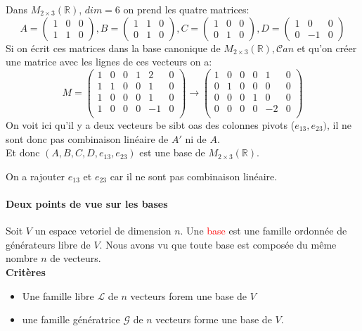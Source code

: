 \begin{exemple}
Dans $M_{2 \times 3}(\mathbb{R})$, $dim = 6$ on prend les quatre matrices:
\[A = \begin{pmatrix}
    1 & 0 & 0 \\ 1 & 1 & 0
\end{pmatrix} ,  B = \begin{pmatrix}
    1 & 1 & 0 \\ 0 & 1 & 0
\end{pmatrix}, C  = \begin{pmatrix}
    1 & 0 & 0 \\ 0 & 1 & 0
\end{pmatrix}, D = \begin{pmatrix}
    1 & 0 & 0 \\ 0 & -1 & 0
\end{pmatrix}\]
Si on écrit ces matrices dans la base canonique de $M_{2\times 3}(\mathbb{R}), \mathcal{C}an$ et qu'on créer une matrice avec les lignes de ces vecteurs on a:
\[M = \begin{pmatrix}
    1 & 0 & 0 & 1 & 2 & 0\\
    1 & 1 & 0 & 0 & 1 & 0\\
    1 & 0 & 0 & 0 & 1 & 0 \\
    1 & 0 & 0 & 0 & - 1 & 0 \\
\end{pmatrix} \to \begin{pmatrix}
    1 & 0 & 0 & 0 & 1 & 0\\
    0 & 1 & 0 & 0 & 0 & 0\\
    0 & 0 & 0 & 1 & 0 & 0 \\
    0 & 0 & 0 & 0 & - 2 & 0 \\
\end{pmatrix} \]
On voit ici qu'il y a deux vecteurs be sibt oas des colonnes pivots ($e_{13}, e_{23})$, il ne sont donc pas combinaison linéaire de $A'$ ni de $A$.
\\
Et donc $(A, B, C, D, e_{13}, e_{23})$ est une base de $M_{2\times 3}(\mathbb{R})$.
\begin{framedremark}
    On a rajouter $e_{13}$ et $e_{23}$ car il ne sont pas combinaison linéaire.
\end{framedremark}
\end{exemple}

\paragraph{Deux points de vue sur les bases}
Soit $V$ un espace vetoriel de dimension $n$. Une \textcolor{red}{base} est une famille ordonnée de générateurs libre de $V$. Nous avons vu que toute base est composée du même nombre $n$ de vecteurs.
\\
\textbf{Critères}
\begin{itemize}
    \item Une famille libre $\mathcal{L}$ de $n$ vecteurs forem une base de $V$
    \item une famille génératrice $\mathcal{G}$ de $n$ vecteurs forme une base de $V$.
\end{itemize}
\\

